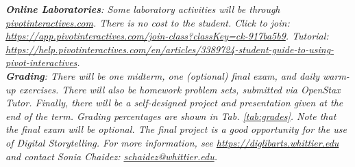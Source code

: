 \documentclass[10pt]{article}
\begin{document}
\textit{\textbf{Online Laboratories}: Some laboratory activities will be through \url{pivotinteractives.com}.  There is no cost to the student.  Click to join: \url{https://app.pivotinteractives.com/join-class?classKey=ck-917ba5b9}. Tutorial: \url{https://help.pivotinteractives.com/en/articles/3389724-student-guide-to-using-pivot-interactives}.} \\
\textit{\textbf{Grading}: There will be one midterm, one (optional) final exam, and daily warm-up exercises.  There will also be homework problem sets, submitted via OpenStax Tutor.  Finally, there will be a self-designed project and presentation given at the end of the term.  Grading percentages are shown in Tab. \ref{tab:grades}.  \textit{Note that the final exam will be optional.} The final project is a good opportunity for the use of Digital Storytelling.  For more information, see \url{https://diglibarts.whittier.edu} and contact Sonia Chaidez: \url{schaidez@whittier.edu}. } \\
\end{document}
